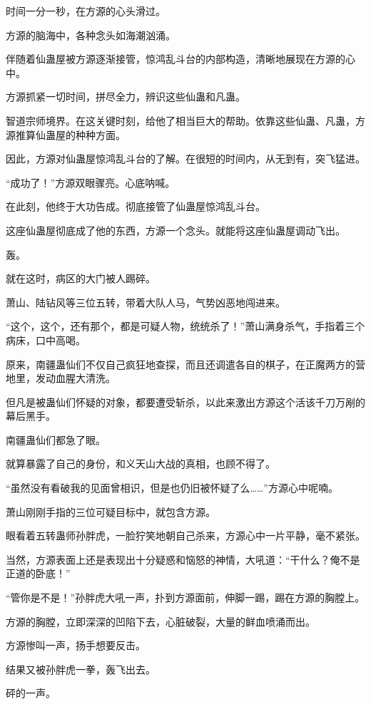 \begin{this_body}
时间一分一秒，在方源的心头滑过。

方源的脑海中，各种念头如海潮汹涌。

伴随着仙蛊屋被方源逐渐接管，惊鸿乱斗台的内部构造，清晰地展现在方源的心中。

方源抓紧一切时间，拼尽全力，辨识这些仙蛊和凡蛊。

智道宗师境界。在这关键时刻，给他了相当巨大的帮助。依靠这些仙蛊、凡蛊，方源推算仙蛊屋的种种方面。

因此，方源对仙蛊屋惊鸿乱斗台的了解。在很短的时间内，从无到有，突飞猛进。

“成功了！”方源双眼骤亮。心底呐喊。

在此刻，他终于大功告成。彻底接管了仙蛊屋惊鸿乱斗台。

这座仙蛊屋彻底成了他的东西，方源一个念头。就能将这座仙蛊屋调动飞出。

轰。

就在这时，病区的大门被人踢碎。

萧山、陆钻风等三位五转，带着大队人马，气势凶恶地闯进来。

“这个，这个，还有那个，都是可疑人物，统统杀了！”萧山满身杀气，手指着三个病床，口中高喝。

原来，南疆蛊仙们不仅自己疯狂地查探，而且还调遣各自的棋子，在正魔两方的营地里，发动血腥大清洗。

但凡是被蛊仙们怀疑的对象，都要遭受斩杀，以此来激出方源这个活该千刀万剐的幕后黑手。

南疆蛊仙们都急了眼。

就算暴露了自己的身份，和义天山大战的真相，也顾不得了。

“虽然没有看破我的见面曾相识，但是也仍旧被怀疑了么……”方源心中呢喃。

萧山刚刚手指的三位可疑目标中，就包含方源。

眼看着五转蛊师孙胖虎，一脸狞笑地朝自己杀来，方源心中一片平静，毫不紧张。

当然，方源表面上还是表现出十分疑惑和恼怒的神情，大吼道：“干什么？俺不是正道的卧底！”

“管你是不是！”孙胖虎大吼一声，扑到方源面前，伸脚一踢，踢在方源的胸膛上。

方源的胸膛，立即深深的凹陷下去，心脏破裂，大量的鲜血喷涌而出。

方源惨叫一声，扬手想要反击。

结果又被孙胖虎一拳，轰飞出去。

砰的一声。


\end{this_body}
